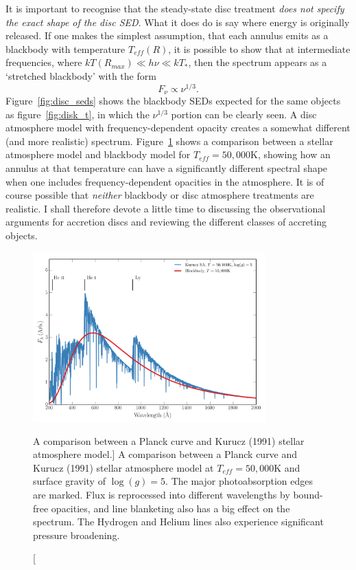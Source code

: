 It is important to recognise that the steady-state disc treatment
{\sl does not specify the exact shape of the disc SED}. What it does do is 
say where energy is originally released. If one makes the simplest assumption,
that each annulus emits as a blackbody with temperature $T_{eff} (R)$, it is 
possible to show that at intermediate frequencies, where $kT(R_{max}) \ll h \nu \ll kT_*$,
then the spectrum appears as a `stretched blackbody' with the form 
\begin{equation}
F_{\nu} \propto \nu^{1/3}.
\end{equation}
Figure~\ref{fig:disc_seds} shows the blackbody SEDs expected for the same 
objects as figure~\ref{fig:disk_t}, in
which the $\nu^{1/3}$ portion can be clearly seen.
A disc atmosphere model with frequency-dependent opacity creates a somewhat 
different (and more realistic) spectrum. 
Figure~\ref{fig:bb_v_sa} shows a comparison between a stellar atmosphere model and
blackbody model for $T_{eff}=50,000$K, showing how an annulus at that temperature
can have a significantly different spectral shape when one includes frequency-dependent opacities
in the atmosphere. It is of course possible that {\em neither} blackbody or disc atmosphere
treatments are realistic. I shall therefore devote a little time to discussing
the observational arguments for accretion discs and reviewing
the different classes of accreting objects.

\begin{figure}
\centering
\includegraphics[width=0.8\textwidth]{figures/01-intro/bb_v_sa.png}
\caption
[A comparison between a Planck curve and Kurucz (1991) stellar atmosphere model.]
{
A comparison between a Planck curve and Kurucz (1991) stellar atmosphere model
at $T_{eff}=50,000$K and surface gravity of $\log(g)=5$. The major photoabsorption
edges are marked. Flux is reprocessed into different wavelengths by bound-free opacities,
and line blanketing also has a big effect on the spectrum. The Hydrogen and Helium lines
also experience significant pressure broadening.
} 
\label{fig:bb_v_sa}
\end{figure}


